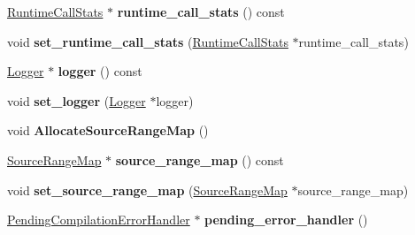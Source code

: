 \begin{DoxyCompactItemize}
\mbox{\label{classv8_1_1internal_1_1ParseInfo_a974532b7f55ca5b41dd8d3667d94e6bf}} 
\mbox{\hyperlink{classv8_1_1internal_1_1RuntimeCallStats}{Runtime\+Call\+Stats}} $\ast$ {\bfseries runtime\+\_\+call\+\_\+stats} () const
\item 
\mbox{\label{classv8_1_1internal_1_1ParseInfo_ae22f1043c11382c9501472f6ab05a2b8}} 
void {\bfseries set\+\_\+runtime\+\_\+call\+\_\+stats} (\mbox{\hyperlink{classv8_1_1internal_1_1RuntimeCallStats}{Runtime\+Call\+Stats}} $\ast$runtime\+\_\+call\+\_\+stats)
\item 
\mbox{\label{classv8_1_1internal_1_1ParseInfo_adf8c2aa733a307d0d76ed7f7f4b2833d}} 
\mbox{\hyperlink{classv8_1_1internal_1_1Logger}{Logger}} $\ast$ {\bfseries logger} () const
\item 
\mbox{\label{classv8_1_1internal_1_1ParseInfo_a1a724c38083484c023449e970d6e358c}} 
void {\bfseries set\+\_\+logger} (\mbox{\hyperlink{classv8_1_1internal_1_1Logger}{Logger}} $\ast$logger)
\item 
\mbox{\label{classv8_1_1internal_1_1ParseInfo_a2e72e65905f9e91429ae71bc564dfca6}} 
void {\bfseries Allocate\+Source\+Range\+Map} ()
\item 
\mbox{\label{classv8_1_1internal_1_1ParseInfo_ace7d17dc760e1359d4a51f96f38ed93c}} 
\mbox{\hyperlink{classv8_1_1internal_1_1SourceRangeMap}{Source\+Range\+Map}} $\ast$ {\bfseries source\+\_\+range\+\_\+map} () const
\item 
\mbox{\label{classv8_1_1internal_1_1ParseInfo_ae8af51d692acf3ae2179837329fab81a}} 
void {\bfseries set\+\_\+source\+\_\+range\+\_\+map} (\mbox{\hyperlink{classv8_1_1internal_1_1SourceRangeMap}{Source\+Range\+Map}} $\ast$source\+\_\+range\+\_\+map)
\item 
\mbox{\label{classv8_1_1internal_1_1ParseInfo_a9959c55a017a3648ba8a31707b6089fe}} 
\mbox{\hyperlink{classv8_1_1internal_1_1PendingCompilationErrorHandler}{Pending\+Compilation\+Error\+Handler}} $\ast$ {\bfseries pending\+\_\+error\+\_\+handler} ()

\end{DoxyCompactItemize}
